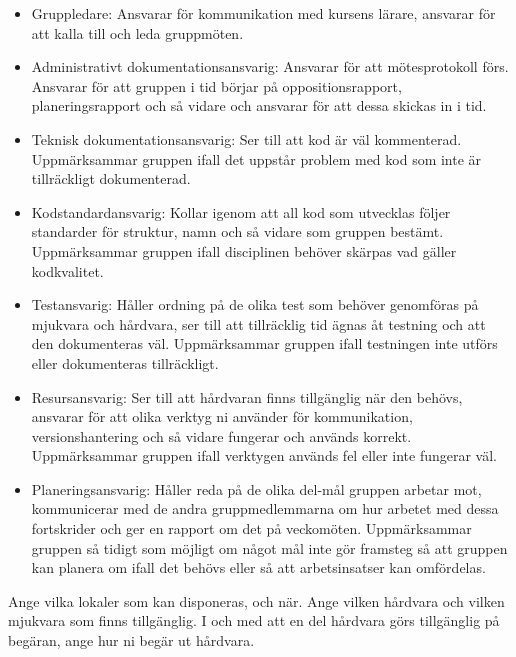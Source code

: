 \documentclass[a4paper]{article}
\begin{document}
\begin{itemize}
    \item Gruppledare: Ansvarar för kommunikation med kursens lärare, 
    ansvarar för att kalla till och leda gruppmöten.

    \item Administrativt dokumentationsansvarig: Ansvarar för att
    mötesprotokoll förs. Ansvarar för att gruppen i tid börjar på
    oppositionsrapport, planeringsrapport och så vidare och ansvarar för
    att dessa skickas in i tid.

    \item Teknisk dokumentationsansvarig: Ser till att kod är väl kommenterad.
    Uppmärksammar gruppen ifall det uppstår problem med kod som inte är
    tillräckligt dokumenterad.

    \item Kodstandardansvarig: Kollar igenom att all kod som utvecklas följer
    standarder för struktur, namn och så vidare som gruppen bestämt.
    Uppmärksammar gruppen ifall disciplinen behöver skärpas vad
    gäller kodkvalitet.

    \item Testansvarig: Håller ordning på de olika test som behöver genomföras
    på mjukvara och hårdvara, ser till att tillräcklig tid ägnas åt
    testning och att den dokumenteras väl. Uppmärksammar gruppen ifall
    testningen inte utförs eller dokumenteras tillräckligt.

    \item Resursansvarig: Ser till att hårdvaran finns tillgänglig när den
    behövs, ansvarar för att olika verktyg ni använder för
    kommunikation, versionshantering och så vidare fungerar och
    används korrekt. Uppmärksammar gruppen ifall verktygen används fel
    eller inte fungerar väl.

    \item Planeringsansvarig: Håller reda på de olika del-mål gruppen arbetar
    mot, kommunicerar med de andra gruppmedlemmarna om hur arbetet med
    dessa fortskrider och ger en rapport om det på veckomöten.
    Uppmärksammar gruppen så tidigt som möjligt om något mål inte gör
    framsteg så att gruppen kan planera om ifall det behövs eller så att
    arbetsinsatser kan omfördelas.
\end{itemize}

Ange vilka lokaler som kan disponeras, och när. Ange vilken hårdvara och
vilken mjukvara som finns tillgänglig. I och med att en del hårdvara
görs tillgänglig på begäran, ange hur ni begär ut hårdvara.
\end{document}
